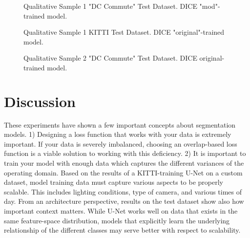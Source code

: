 \documentclass[Location Location Location! : Exploring Image Segmentation Problem In Urban Driving Scenarios]{IEEEtran}
\begin{document}
\begin{figure}[htbp]
\caption{Qualitative Sample 1 "DC Commute" Test Dataset. DICE "mod"-trained model.}
\label{dc-sample-1-dice-mod}
\end{figure}





\begin{figure}[htbp]
\caption{Qualitative Sample 1 KITTI Test Dataset. DICE "original"-trained model.}
\label{dc-sample-1-dice-og}
\end{figure}



\begin{figure}[htbp]
\caption{Qualitative Sample 2 "DC Commute" Test Dataset. DICE original-trained model.}
\label{dc-sample-2-dice-og}
\end{figure}


\section{Discussion}

 
These experiments have shown a few important concepts about segmentation models. 1) Designing a loss function that works with your data is extremely important. If your data is severely imbalanced, choosing an overlap-based loss function is a viable solution to working with this deficiency. 2) It is important to train your model with enough data which captures the different variances of the operating domain. Based on the results of a KITTI-training U-Net on a custom dataset, model training data must capture various aspects to be properly scalable. This includes lighting conditions, type of camera, and various times of day. From an architecture perspective, results on the test dataset show also how important context matters. While U-Net works well on data that exists in the same feature-space distribution, models that explicitly learn the underlying relationship of the different classes may serve better with respect to scalability.  
\end{document}
